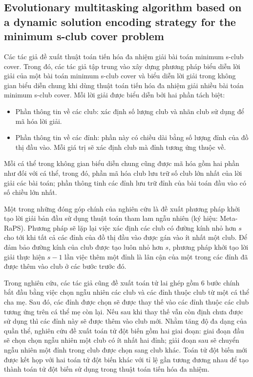 \subsection{Evolutionary multitasking algorithm based on a dynamic solution encoding strategy for the minimum s-club cover problem~\cite{thanh2025evolutionary}}

Các tác giả đề xuất thuật toán tiến hóa đa nhiệm giải bài toán minimum s-club cover. Trong đó, các tác giả tập trung vào xây dựng phương pháp biểu diễn lời giải của một bài toán minimum s-club cover và biểu diễn lời giải trong không gian biểu diễn chung khi dùng thuật toán tiến hóa đa nhiệm giải nhiều bài toán minimum s-club cover. Mỗi lời giải được biểu diễn bởi hai phần tách biệt: 
\begin{itemize}
	\item Phần thông tin về các club: xác định số lượng club và nhãn club sử dụng để mã hóa lời giải.
	
	\item Phần thông tin về các đỉnh: phần này có chiều dài bằng số lượng đỉnh của đồ thị đầu vào. Mỗi giá trị sẽ xác định club mà đỉnh tương ứng thuộc về.
\end{itemize}
Mỗi cá thể trong không gian biểu diễn chung cũng được mã hóa gồm hai phần như đối với cá thể, trong đó, phần mã hóa club lưu trữ số club lớn nhất của lời giải các bài toán; phần thông tinh các đỉnh lưu trữ đỉnh của bài toán đầu vào có số chiều lớn nhất.

Một trong những đóng góp chính của nghiên cứu là đề xuất phương pháp khởi tạo lời giải bản đầu sử dụng thuật toán tham lam ngẫu nhiên (ký hiệu: Meta-RaPS). Phương pháp sẽ lặp lại việc xác định các club có đường kính nhỏ hơn $s$ cho tới khi tất cả các đỉnh của đồ thị đầu vào được gán vào ít nhất một club. Để đảm bảo đường kính của club được tạo luôn nhỏ hơn $s$, phương pháp khởi tạo lời giải thực hiện $s-1$ lần việc thêm một đỉnh là lân cận của một trong các đỉnh đã được thêm vào club ở các bước trước đó.

Trong nghiên cứu, các tác giả cũng đề xuất toán tử lai ghép gồm 6 bước chính bắt đầu bằng việc chọn ngẫu nhiên các club và các đỉnh thuộc club từ một cá thể cha mẹ. Sau đó, các đỉnh được chọn sẽ được thay thế vào các đỉnh thuộc các club tương ứng trên cá thể mẹ còn lại. Nếu sau khi thay thế vẫn còn định chưa được sử dụng thì các đỉnh này sẽ được thêm vào club mới. Nhằm tăng độ đa dạng của quần thể, nghiên cứu đề xuất toán tử đột biến gồm hai giai đoạn: giai đoạn đầu sẽ chọn chọn ngẫu nhiên một club có ít nhất hai đỉnh; giải đoạn sau sẽ chuyển ngẫu nhiên một đỉnh trong club được chọn sang club khác. Toán tử đột biến mới được kết họp với hai toán tử đột biến khác với tỉ lệ gần tương đương nhau để tạo thành toán tử đột biến sử dụng trong thuật toán tiến hóa đa nhiệm.

